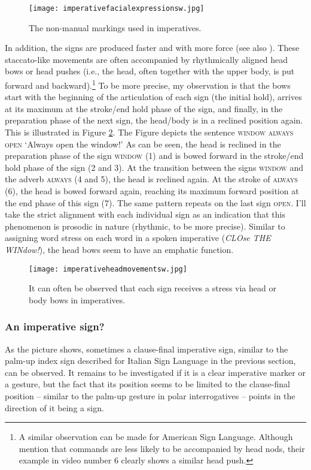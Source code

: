 \begin{figure}[bt]
\centering
	\texttt{[image: imperativefacialexpressionsw.jpg]}
	\caption{The non-manual markings used in imperatives.}
	\label{fig:imperativefacial}
\end{figure}

In addition, the signs are produced faster and with more force (see also \citealt[341]{happ2014vork}). These staccato-like movements are often accompanied by rhythmically aligned head bows or head pushes (i.e., the head, often together with the upper body, is put forward and backward).\footnote{A similar observation can be made for American Sign Language. Although \citet{brentari2018production} mention that commands are less likely to be accompanied by head nods, their example in video number 6 clearly shows a similar head push.} To be more precise, my observation is that the bows start with the beginning of the articulation of each sign (the initial hold), arrives at its maximum at the stroke/end hold phase of the sign, and finally, in the preparation phase of the next sign, the head/body is in a reclined position again. This is illustrated in Figure \ref{fig:headmoveimp}. The Figure depicts the sentence \textsc{window always open} `Always open the window!' As can be seen, the head is reclined in the preparation phase of the sign \textsc{window} (1) and is bowed forward in the stroke/end hold phase of the sign (2 and 3). At the transition between the signs \textsc{window} and the adverb \textsc{always} (4 and 5), the head is reclined again.  At the stroke of \textsc{always} (6), the head is bowed forward again, reaching its maximum forward position at the end phase of this sign (7). The same pattern repeats on the last sign \textsc{open}. I'll take the strict alignment with each individual sign as an indication that this phenomenon is prosodic in nature (rhythmic, to be more precise). Similar to assigning word stress on each word in a spoken imperative (\textit{CLOse THE WINdow!}), the head bows seem to have an emphatic function.%

\begin{figure}[bt]
\centering
	\texttt{[image: imperativeheadmovementsw.jpg]}
	\caption{It can often be observed that each sign receives a stress via head or body bows in imperatives.}
	\label{fig:headmoveimp}
\end{figure}

\subsubsection{An imperative sign?}
As the picture shows, sometimes a clause-final imperative sign, similar to the palm-up index sign described for Italian Sign Language in the previous section, can be observed. It remains to be investigated if it is a clear imperative marker or a gesture, but the fact that its position seems to be limited to the clause-final position -- similar to the palm-up gesture in polar interrogatives -- points in the direction of it being a sign.

